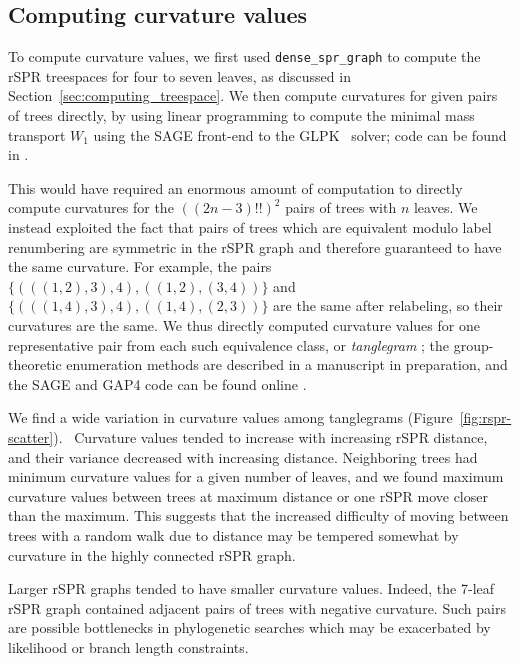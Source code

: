 \documentclass[11pt,onecolumn,conference]{IEEEtran}
\begin{document}
\subsection{Computing curvature values}
To compute curvature values, we first used \texttt{dense\_spr\_graph} to compute the rSPR treespaces for four to seven leaves, as discussed in Section~\ref{sec:computing_treespace}.
We then compute curvatures for given pairs of trees directly, by using linear programming to compute the minimal mass transport $W_1$ using the SAGE \cite{SAGE} front-end to the GLPK~\cite{glpk} solver; code can be found in \cite{gricci}.

This would have required an enormous amount of computation to directly compute curvatures for the $((2n-3)!!)^2$ pairs of trees with $n$ leaves.
We instead exploited the fact that pairs of trees which are equivalent modulo label renumbering are symmetric in the rSPR graph and therefore guaranteed to have the same curvature.
For example, the pairs
$\{(((1,2),3),4), ((1,2),(3,4))\}$ and
$\{(((1,4),3),4), ((1,4),(2,3))\}$
are the same after relabeling, so their curvatures are the same.
We thus directly computed curvature values for one representative pair from each such equivalence class, or \emph{tanglegram} \cite{Venkatachalam2010-zh}; the group-theoretic enumeration methods are described in a manuscript in preparation, and the SAGE \cite{SAGE} and GAP4 \cite{GAP4} code can be found online \cite{tangle}.

We find a wide variation in curvature values among tanglegrams (Figure~\ref{fig:rspr-scatter}).~
Curvature values tended to increase with increasing rSPR distance, and their variance decreased with increasing distance.
Neighboring trees had minimum curvature values for a given number of leaves, and we found maximum curvature values between trees at maximum distance or one rSPR move closer than the maximum.
This suggests that the increased difficulty of moving between trees with a random walk due to distance may be tempered somewhat by curvature in the highly connected rSPR graph.

Larger rSPR graphs tended to have smaller curvature values.
Indeed, the 7-leaf rSPR graph contained adjacent pairs of trees with negative curvature.
Such pairs are possible bottlenecks in phylogenetic searches which may be exacerbated by likelihood or branch length constraints.
\end{document}
